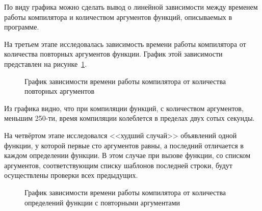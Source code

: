         По виду графика можно сделать вывод о линейной зависимости между временем работы компилятора и количеством аргументов функций, описываемых в программе.
        
        На третьем этапе исследовалась зависимость времени работы компилятора от количества повторных аргументов функции.
        График этой зависимости представлен на рисунке~\ref{pic:compmatch}.

        \begin{figure}[ht!]
            \centering
            \caption{График зависимости времени работы компилятора от количества повторных аргументов}
            \label{pic:compmatch}
        \end{figure}

        Из графика видно, что при компиляции функций, с количеством аргументов, меньшим 250-ти, время компиляции колеблется в пределах двух сотых секунды.

        На четвёртом этапе исследовался <<худший случай>> объявлений одной функции, у которой первые сто аргументов равны, а последний отличается в каждом определении функции.
        В этом случае при вызове функции, со списком аргументов, соответствующим списку шаблонов последней строки, будут осуществлены проверки всех предыдущих.

        \begin{figure}[ht!]
            \centering
            \caption{График зависимости времени работы компилятора от количества определений функции с повторными аргументами}
            \label{pic:compworth}
        \end{figure}

